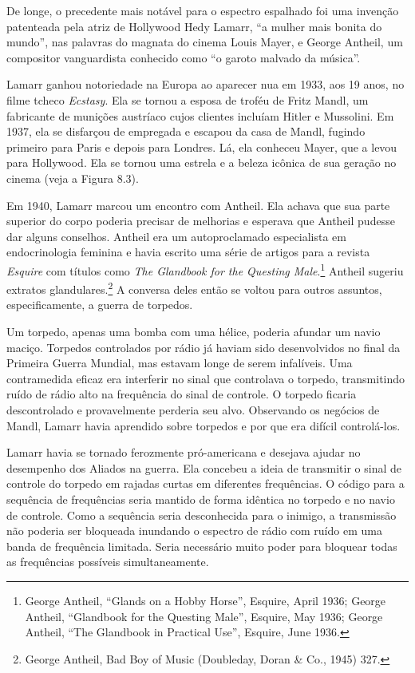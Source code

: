 \documentclass{book}
\newcommand{\ingles}[1]{\textit{#1}}
\begin{document}
De longe, o precedente mais notável para o espectro espalhado foi uma invenção
patenteada pela atriz de Hollywood Hedy Lamarr, ``a mulher mais bonita do mundo'',
nas palavras do magnata do cinema Louis Mayer, e George Antheil, um compositor
vanguardista conhecido como ``o garoto malvado da música''.

Lamarr ganhou notoriedade na Europa ao aparecer nua em 1933, aos 19 anos, no
filme tcheco \ingles{Ecstasy}. Ela se tornou a esposa de troféu de Fritz Mandl,
um fabricante de munições austríaco cujos clientes incluíam Hitler e Mussolini.
Em 1937, ela se disfarçou de empregada e escapou da casa de Mandl, fugindo
primeiro para Paris e depois para Londres. Lá, ela conheceu Mayer, que a levou
para Hollywood. Ela se tornou uma estrela e a beleza icônica de sua geração no
cinema (veja a Figura 8.3).

Em 1940, Lamarr marcou um encontro com Antheil. Ela achava que sua parte superior
do corpo poderia precisar de melhorias e esperava que Antheil pudesse dar alguns
conselhos. Antheil era um autoproclamado especialista em endocrinologia feminina
e havia escrito uma série de artigos para a revista \ingles{Esquire} com títulos 
como \ingles{The Glandbook for the Questing Male}.\footnote{George Antheil, 
``Glands on a Hobby Horse'', Esquire, April 1936; George Antheil, ``Glandbook
for the Questing Male'', Esquire, May 1936; George Antheil, ``The Glandbook in
Practical Use'', Esquire, June 1936.} Antheil sugeriu extratos 
glandulares.\footnote{George Antheil, Bad Boy of Music (Doubleday, Doran \& Co.,
1945) 327.} A conversa deles então se voltou para outros assuntos,
especificamente, a guerra de torpedos.

Um torpedo, apenas uma bomba com uma hélice, poderia afundar um navio maciço.
Torpedos controlados por rádio já haviam sido desenvolvidos no final da Primeira
Guerra Mundial, mas estavam longe de serem infalíveis. Uma contramedida eficaz
era interferir no sinal que controlava o torpedo, transmitindo ruído de rádio
alto na frequência do sinal de controle. O torpedo ficaria descontrolado e
provavelmente perderia seu alvo. Observando os negócios de Mandl, Lamarr havia
aprendido sobre torpedos e por que era difícil controlá-los.

Lamarr havia se tornado ferozmente pró-americana e desejava ajudar no desempenho
dos Aliados na guerra. Ela concebeu a ideia de transmitir o sinal de controle do
torpedo em rajadas curtas em diferentes frequências. O código para a sequência de
frequências seria mantido de forma idêntica no torpedo e no navio de controle.
Como a sequência seria desconhecida para o inimigo, a transmissão não poderia ser
bloqueada inundando o espectro de rádio com ruído em uma banda de frequência
limitada. Seria necessário muito poder para bloquear todas as frequências
possíveis simultaneamente.\\ 
\end{document}
